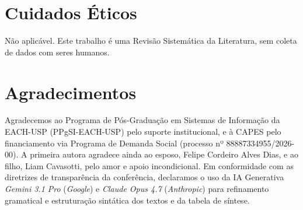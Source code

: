 \documentclass[12pt]{article}
\begin{document}
    \section*{Cuidados Éticos}

    Não aplicável. Este trabalho é uma Revisão Sistemática da Literatura, sem coleta de dados com seres humanos.

    \section*{Agradecimentos}

    Agradecemos ao Programa de Pós-Graduação em Sistemas de Informação da EACH-USP (PPgSI-EACH-USP) pelo suporte institucional, e à CAPES pelo financiamento via Programa de Demanda Social (processo nº 88887334955/2026-00). A primeira autora agradece ainda ao esposo, Felipe Cordeiro Alves Dias, e ao filho, Liam Cavasotti, pelo amor e apoio incondicional. Em conformidade com as diretrizes de transparência da conferência, declaramos o uso da IA Generativa \textit{Gemini 3.1 Pro} (\textit{Google}) e \textit{Claude Opus 4.7} (\textit{Anthropic}) para refinamento gramatical e estruturação sintática dos textos e da tabela de síntese.




\end{document}
